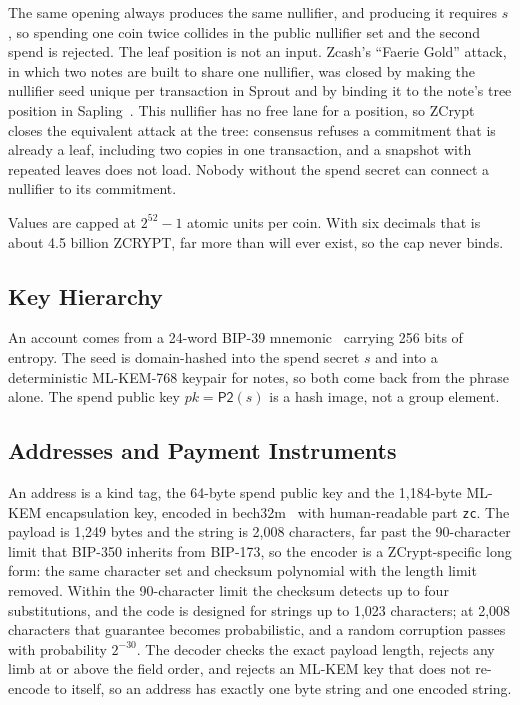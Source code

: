 \documentclass[twocolumn,10pt]{article}
\begin{document}
The same opening always produces the same nullifier, and producing it requires $s$, so spending one coin twice collides in the public nullifier set and the second spend is rejected. The leaf position is not an input. Zcash's ``Faerie Gold'' attack, in which two notes are built to share one nullifier, was closed by making the nullifier seed unique per transaction in Sprout and by binding it to the note's tree position in Sapling~\cite{hopwood2016zcash}. This nullifier has no free lane for a position, so ZCrypt closes the equivalent attack at the tree: consensus refuses a commitment that is already a leaf, including two copies in one transaction, and a snapshot with repeated leaves does not load. Nobody without the spend secret can connect a nullifier to its commitment.

Values are capped at $2^{52}-1$ atomic units per coin. With six decimals that is about 4.5 billion ZCRYPT, far more than will ever exist, so the cap never binds.

\subsection{Key Hierarchy}

An account comes from a 24-word BIP-39 mnemonic~\cite{bip39} carrying 256 bits of entropy. The seed is domain-hashed into the spend secret $s$ and into a deterministic ML-KEM-768 keypair for notes, so both come back from the phrase alone. The spend public key $\mathit{pk}=\mathsf{P2}(s)$ is a hash image, not a group element.

\subsection{Addresses and Payment Instruments}
\label{sec:addresses}

An address is a kind tag, the 64-byte spend public key and the 1,184-byte ML-KEM encapsulation key, encoded in bech32m~\cite{bip350} with human-readable part \texttt{zc}. The payload is 1,249 bytes and the string is 2,008 characters, far past the 90-character limit that BIP-350 inherits from BIP-173, so the encoder is a ZCrypt-specific long form: the same character set and checksum polynomial with the length limit removed. Within the 90-character limit the checksum detects up to four substitutions, and the code is designed for strings up to 1,023 characters; at 2,008 characters that guarantee becomes probabilistic, and a random corruption passes with probability $2^{-30}$. The decoder checks the exact payload length, rejects any limb at or above the field order, and rejects an ML-KEM key that does not re-encode to itself, so an address has exactly one byte string and one encoded string.
\end{document}

